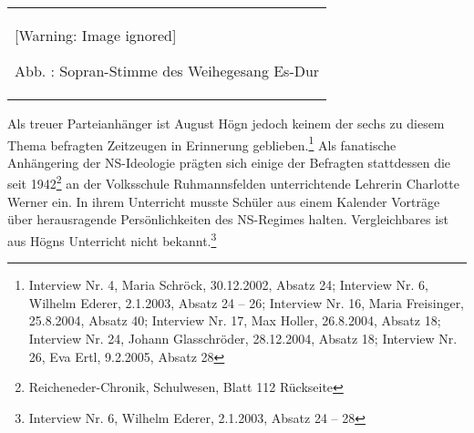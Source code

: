 \documentclass[a4paper]{article}
\newcounter{Abb}
\renewcommand\theAbb{\arabic{Abb}}
\begin{document}
\begin{center}
\begin{minipage}{8.835cm}
\begin{center}
\tablefirsthead{}
\tablehead{}
\tabletail{}
\tablelasttail{}
\begin{supertabular}{m{8.635cm}}
  [Warning: Image ignored] %
 
Abb. \stepcounter{Abb}{\theAbb}: Sopran-Stimme des Weihegesang Es-Dur\\
\end{supertabular}
\end{center}
\end{minipage}
\end{center}
Als treuer Parteianhänger ist August Högn jedoch keinem der sechs zu
diesem Thema befragten Zeitzeugen in Erinnerung geblieben.\footnote{
Interview Nr. 4, Maria Schröck, 30.12.2002, Absatz 24; Interview Nr. 6,
Wilhelm Ederer, 2.1.2003, Absatz 24 – 26; Interview Nr. 16, Maria
Freisinger, 25.8.2004, Absatz 40; Interview Nr. 17, Max Holler,
26.8.2004, Absatz 18; Interview Nr. 24, Johann Glasschröder,
28.12.2004, Absatz 18; Interview Nr. 26, Eva Ertl, 9.2.2005, Absatz 28}
Als fanatische Anhängering der NS-Ideologie prägten sich einige der
Befragten stattdessen die seit 1942\footnote{ Reicheneder-Chronik,
Schulwesen, Blatt 112 Rückseite} an der Volksschule Ruhmannsfelden
unterrichtende Lehrerin Charlotte Werner ein. In ihrem Unterricht
musste Schüler aus einem Kalender Vorträge über herausragende
Persönlichkeiten des NS-Regimes halten. Vergleichbares ist aus Högns
Unterricht nicht bekannt.\footnote{ Interview Nr. 6, Wilhelm Ederer,
2.1.2003, Absatz 24 – 28}
\end{document}
